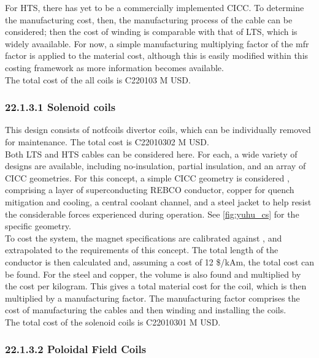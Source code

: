 For HTS, there has yet to be a commercially implemented CICC. To determine the manufacturing cost, then, the manufacturing process of the cable can be considered; then the cost of winding is comparable with that of LTS, which is widely avaailable. For now, a simple manufacturing multiplying factor of the mfr factor is applied to the material cost, although this is easily modified within this costing framework as more information becomes available.\\

The total cost of the all coils is C220103 M USD.


\subsubsection*{22.1.3.1 Solenoid coils}

This design consists of notfcoils divertor coils, which can be individually removed for maintenance. The total cost is C22010302 M USD.\\

Both LTS and HTS cables can be considered here. For each, a wide variety of designs are available, including no-insulation, partial insulation, and an array of CICC geometries. For this concept, a simple CICC geometry is considered \cite{Menard2016}, comprising a layer of superconducting REBCO conductor, copper for quench mitigation and cooling, a central coolant channel, and a steel jacket to help resist the considerable forces experienced during operation. See \ref{fig:yuhu_cs} for the specific geometry.\\

To cost the system, the magnet specifications are calibrated against \cite{Menard2016}, and extrapolated to the requirements of this concept. The total length of the conductor is then calculated and, assuming a cost of 12 \$/kAm, the total cost can be found. For the steel and copper, the volume is also found and multiplied by the cost per kilogram. This gives a total material cost for the coil, which is then multiplied by a manufacturing factor. The manufacturing factor comprises the cost of manufacturing the cables and then winding and installing the coils. \\

The total cost of the solenoid coils is C22010301 M USD.


\subsubsection*{22.1.3.2 Poloidal Field Coils}

